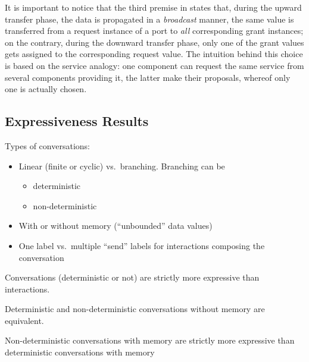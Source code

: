 It is important to notice that the third premise in 
states that, during the upward transfer phase, the data is propagated in a
{\em broadcast} manner, \ie the same value is transferred from a request
instance of a port to {\em all} corresponding grant instances; on the
contrary, during the downward transfer phase, only one of the grant values
gets assigned to the corresponding request value.  The intuition behind
this choice is based on the service analogy: one component can request the
same service from several components providing it, the latter make their
proposals, whereof only one is actually chosen.


\subsection{Expressiveness Results}
\label{sec:expressiveness}


Types of conversations:
\begin{itemize}
\item Linear (finite or cyclic) vs.\ branching.  Branching can be
  \begin{itemize}
  \item deterministic
  \item non-deterministic
  \end{itemize}
\item With or without memory (``unbounded'' data values)
\item One label vs.\ multiple ``send'' labels for interactions composing
  the conversation
\end{itemize}

Conversations (deterministic or not) are strictly more expressive than
interactions.

Deterministic and non-deterministic conversations without memory are
equivalent.

Non-deterministic conversations with memory are strictly more expressive
than deterministic conversations with memory


